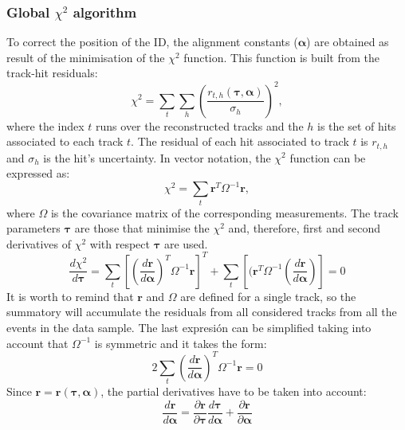\subsubsection{Global $\chi^2$ algorithm} %
To correct the position of the ID, the alignment constants ($\bm{\alpha}$) are obtained as result 
of the minimisation of the $\chi^2$ function. This function is built from the track-hit residuals:
\begin{equation*}
	\chi^{2} =  \sum_{t} \sum_{h} \left( \frac{r_{t,h}(\bm{\tau}, \bm{\alpha})}{\sigma_{h}} \right)^{2},
\end{equation*}
where the index $t$ runs over the reconstructed tracks and the $h$ is the set of hits associated to each 
track $t$. The residual of each hit associated to track $t$ is $r_{t,h}$ and $\sigma_{h}$ is the hit's uncertainty.
In vector notation, the $\chi^2$ function can be expressed as:
\begin{equation*}
	\chi^{2} =  \sum_{t} \bm{r}^{T}\Omega^{-1} \bm{r},
\end{equation*}
where $\Omega$ is the covariance matrix of the corresponding measurements. 
The track parameters $\bm{\tau}$ are those that minimise the $\chi^2$ and, therefore,
first and second derivatives of $\chi^2$ with respect $\bm{\tau}$  are used. %
\begin{equation*}
	\frac{d \chi^{2}}{d \bm{\tau}} =
	 \sum_{t} \left[  \left(\frac{d  \bm{r} }{d \bm{\alpha}} \right)^{T} \Omega^{-1} \bm{r} \right]^{T} +
	 \sum_{t} \left[  (\bm{r}^{T} \Omega^{-1} \left( \frac{d \bm{r}}{d \bm{\alpha}} \right) \right]
	= 0
\end{equation*}
It is worth to remind that $\bm{r}$ and $\Omega$ are defined for a single track, so the summatory will 
accumulate the residuals from all considered tracks from all the events in the data sample. The last 
expresión can be simplified taking into account that $\Omega^{-1}$ is symmetric and it takes the form:
\begin{equation}\label{eq:Chap2:Chi2_A}
	2 \sum_{t} \left(\frac{d  \bm{r} }{d \bm{\alpha}} \right)^{T} \Omega^{-1} \bm{r} = 0
\end{equation}
Since $\bm{r} = \bm{r}(\bm{\tau}, \bm{\alpha})$, the partial derivatives have to be taken into account:
\begin{equation*}
	\frac{d  \bm{r} }{d \bm{\alpha}} =
	 \frac{\partial  \bm{r} }{\partial \bm{\tau}} \frac{d  \bm{\tau} }{d \bm{\alpha}} + 
	  \frac{\partial  \bm{r} }{\partial \bm{\alpha}} 
\end{equation*}
